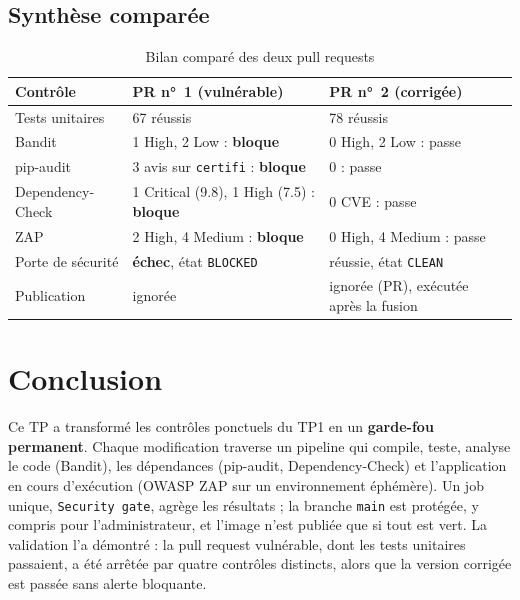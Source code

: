 \documentclass[11pt,a4paper]{article}
\newcommand{\code}[1]{\texttt{#1}}
\begin{document}
\subsection{Synthèse comparée}
\begin{table}[H]
\centering
\small
\begin{tabularx}{\textwidth}{@{}lLL@{}}
\toprule
\textbf{Contrôle} & \textbf{PR n°~1 (vulnérable)} & \textbf{PR n°~2 (corrigée)} \\
\midrule
Tests unitaires & 67 réussis & 78 réussis \\
Bandit & 1 High, 2 Low : \textbf{bloque} & 0 High, 2 Low : passe \\
pip-audit & 3 avis sur \code{certifi} : \textbf{bloque} & 0 : passe \\
Dependency-Check & 1 Critical (9.8), 1 High (7.5) : \textbf{bloque} & 0 CVE : passe \\
ZAP & 2 High, 4 Medium : \textbf{bloque} & 0 High, 4 Medium : passe \\
Porte de sécurité & \textbf{échec}, état \code{BLOCKED} & réussie, état \code{CLEAN} \\
Publication & ignorée & ignorée (PR), exécutée après la fusion \\
\bottomrule
\end{tabularx}
\caption{Bilan comparé des deux pull requests}
\end{table}

\section{Conclusion}
Ce TP a transformé les contrôles ponctuels du TP1 en un \textbf{garde-fou permanent}. Chaque
modification traverse un pipeline qui compile, teste, analyse le code (Bandit), les dépendances
(pip-audit, Dependency-Check) et l'application en cours d'exécution (OWASP ZAP sur un environnement
éphémère). Un job unique, \code{Security gate}, agrège les résultats ; la branche \code{main} est
protégée, y compris pour l'administrateur, et l'image n'est publiée que si tout est vert. La
validation l'a démontré : la pull request vulnérable, dont les tests unitaires passaient, a été arrêtée
par quatre contrôles distincts, alors que la version corrigée est passée sans alerte bloquante.
\end{document}
